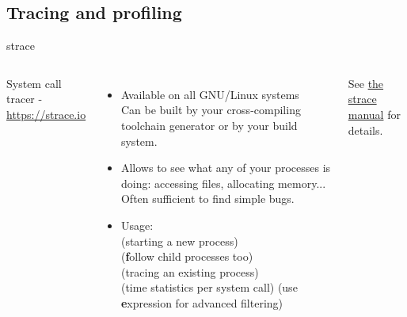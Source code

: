 \subsection{Tracing and profiling}

\begin{frame}[fragile]{strace}
  \begin{columns}
  \small
  System call tracer - \url{https://strace.io}
  \begin{itemize}
  \item Available on all GNU/Linux systems\\
        Can be built by your cross-compiling toolchain generator or by your build system.
  \item Allows to see what any of your processes is doing: accessing files, allocating memory...
        Often sufficient to find simple bugs.
  \item Usage:\\
     (starting a new process)\\
     ({\bf f}ollow child processes too)\\
     (tracing an existing process)\\
     (time statistics per system call)
     (use {\bf e}xpression for advanced filtering)
  \end{itemize}
  See \href{https://man7.org/linux/man-pages/man1/strace.1.html}{the strace manual} for details.

\end{columns}
\end{frame}
